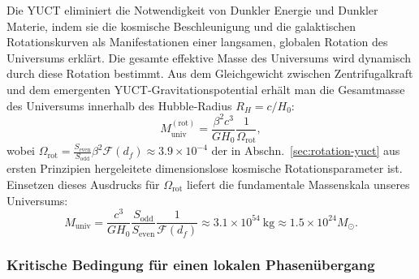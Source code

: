 \documentclass[11pt,a4paper]{article}
\begin{document}
	Die YUCT eliminiert die Notwendigkeit von Dunkler Energie und Dunkler Materie, indem sie die kosmische Beschleunigung und die galaktischen Rotationskurven als Manifestationen einer langsamen, globalen Rotation des Universums erklärt. Die gesamte effektive Masse des Universums wird dynamisch durch diese Rotation bestimmt. Aus dem Gleichgewicht zwischen Zentrifugalkraft und dem emergenten YUCT‑Gravitationspotential erhält man die Gesamtmasse des Universums innerhalb des Hubble‑Radius \(R_H = c/H_0\):
	\begin{equation}
		M_{\mathrm{univ}}^{\mathrm{(rot)}} = \frac{\beta^2 c^3}{G H_0} \frac{1}{\Omega_{\mathrm{rot}}},
	\end{equation}
	wobei \(\Omega_{\mathrm{rot}} = \frac{S_{\mathrm{even}}}{S_{\mathrm{odd}}} \beta^2 \mathcal{F}(d_f) \approx 3.9 \times 10^{-4}\) der in Abschn.~\ref{sec:rotation-yuct} aus ersten Prinzipien hergeleitete dimensionslose kosmische Rotationsparameter ist. Einsetzen dieses Ausdrucks für \(\Omega_{\mathrm{rot}}\) liefert die fundamentale Massenskala unseres Universums:
	\begin{equation}
		M_{\mathrm{univ}} = \frac{c^3}{G H_0} \frac{S_{\mathrm{odd}}}{S_{\mathrm{even}}} \frac{1}{\mathcal{F}(d_f)} \approx 3.1 \times 10^{54}\ \mathrm{kg} \approx 1.5 \times 10^{24} M_{\odot}.
	\end{equation}
	
	\subsubsection{Kritische Bedingung für einen lokalen Phasenübergang}
	
\end{document}
